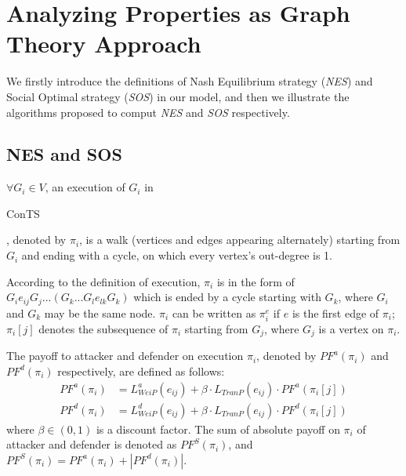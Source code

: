 \documentclass{acm_proc_article-sp}
\begin{document}
\section{Analyzing Properties as Graph Theory Approach}
We firstly introduce the definitions of Nash Equilibrium strategy (\textit{NES}) and Social Optimal strategy (\textit{SOS}) in our model, and then we illustrate the algorithms proposed to comput \textit{NES} and \textit{SOS} respectively.
\subsection{NES and SOS}
\begin{definition}
$\forall G_{\textit{i}}\in V$, an \textsf{execution} of $G_{\textit{i}}$ in \begin{bf}{ConTS}\end{bf}, denoted by $\pi_{\textit{i}}$, is a walk (vertices and edges appearing alternately) starting from $G_{\textit{i}}$ and ending with a cycle, on which every vertex's out-degree is 1.
\end{definition}
According to the definition of execution, $\pi_{\textit{i}}$ is in the form of $G_{\textit{i}}e_{\textit{ij}}G_{\textit{j}}...(G_{\textit{k}}...G_{\textit{l}}e_{\textit{lk}}G_{\textit{k}})$ which is ended by a cycle starting with $G_{\textit{k}}$, where $G_{\textit{i}}$ and $G_{\textit{k}}$ may be the same node. $\pi_{i}$ can be written as $\pi_{i}^e$ if $e$ is the first edge of $\pi_{i}$;
$\pi_{\textit{i}}[j]$ denotes the subsequence of $\pi_{\textit{i}}$ starting from $G_{\textit{j}}$, where $G_{\textit{j}}$ is a vertex on $\pi_{\textit{i}}$.
\begin{definition}
The \textsf{payoff} to attacker and defender on execution $\pi_{\textit{i}}$, denoted by $PF^a(\pi_{\textit{i}})$ and $PF^d(\pi_{\textit{i}})$ respectively, are defined as follows:
\begin{align*}
PF^a(\pi_{\textit{i}})&=L^a_{\textit{WeiP}}(e_{\textit{ij}}) +\beta\cdot L_{\textit{TranP}}(e_{\textit{ij}})\cdot PF^a(\pi_{\textit{i}}[j])\\
PF^d(\pi_{\textit{i}})&=L^d_{\textit{WeiP}}(e_{\textit{ij}}) +\beta\cdot L_{\textit{TranP}}(e_{\textit{ij}})\cdot PF^d(\pi_{\textit{i}}[j])
\end{align*}
where $\beta\in(0,1)$ is a discount factor. The sum of absolute payoff on $\pi_{\textit{i}}$ of attacker and defender is denoted as $PF^{\textit{S}}(\pi_{\textit{i}})$, and  $PF^{\textit{S}}(\pi_{\textit{i}})=PF^a(\pi_{\textit{i}})+ |PF^d(\pi_{\textit{i}})|$.
\end{definition}
\end{document}
